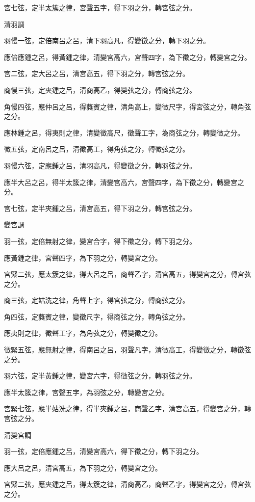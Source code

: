 \begin{pinyinscope}
宮七弦，定半太簇之律，宮聲五字，得下羽之分，轉宮弦之分。

清羽調

羽慢一弦，定倍南呂之呂，清下羽高凡，得變徵之分，轉下羽之分。

應倍應鍾之呂，得黃鍾之律，清變宮高六，宮聲四字，為下徵之分，轉變宮之分。

宮二弦，定大呂之呂，清宮高五，得下羽之分，轉宮弦之分。

商慢三弦，定夾鍾之呂，清商高乙，得變弦之分，轉商弦之分。

角慢四弦，應仲呂之呂，得蕤賓之律，清角高上，變徵尺字，得宮弦之分，轉角弦之分。

應林鍾之呂，得夷則之律，清變徵高尺，徵聲工字，為商弦之分，轉變徵之分。

徵五弦，定南呂之呂，清徵高工，得角弦之分，轉徵弦之分。

羽慢六弦，定應鍾之呂，清羽高凡，得變徵之分，轉羽弦之分。

應半大呂之呂，得半太簇之律，清變宮高六，宮聲四字，為下徵之分，轉變宮之分。

宮七弦，定半夾鍾之呂，清宮高五，得下羽之分，轉宮弦之分。

變宮調

羽一弦，定倍無射之律，變宮合字，得下徵之分，轉下羽之分。

應黃鍾之律，宮聲四字，為下羽之分，轉變宮之分。

宮緊二弦，應太簇之律，得大呂之呂，商聲乙字，清宮高五，得變宮之分，轉宮弦之分。

商三弦，定姑洗之律，角聲上字，得宮弦之分，轉商弦之分。

角四弦，定蕤賓之律，變徵尺字，得商弦之分，轉角弦之分。

應夷則之律，徵聲工字，為角弦之分，轉變徵之分。

徵緊五弦，應無射之律，得南呂之呂，羽聲凡字，清徵高工，得變徵之分，轉徵弦之分。

羽六弦，定半黃鍾之律，變宮六字，得徵弦之分，轉羽弦之分。

應半太簇之律，宮聲五字，為羽弦之分，轉變宮之分。

宮緊七弦，應半姑洗之律，得半夾鍾之呂，商聲乙字，清宮高五，得變宮之分，轉宮弦之分。

清變宮調

羽一弦，定倍應鍾之呂，清變宮高六，得下徵之分，轉下羽之分。

應大呂之呂，清宮高五，為下羽之分，轉變宮之分。

宮緊二弦，應夾鍾之呂，得太簇之律，清商高乙，商聲乙字，得變宮之分，轉宮弦之分。


\end{pinyinscope}
